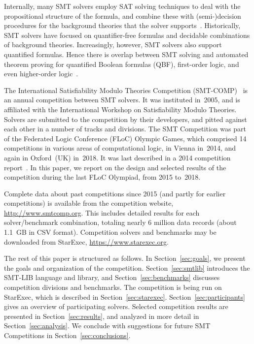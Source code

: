 \documentclass[dvipsnames,table,twoside,11pt]{article}
\begin{document}
Internally, many SMT solvers employ SAT solving techniques to deal
with the propositional structure of the formula, and combine these
with (semi-)decision procedures for the background theories that the
solver
supports~\cite{DBLP:conf/cav/BarrettCDHJKRT11,DBLP:conf/cade/BoutonODF09,DBLP:conf/tacas/MouraB08,Nieuwenhuis:2006:SSS:1217856.1217859}.
Historically, SMT solvers have focused on quantifier-free formulas and
decidable combinations of background theories.  Increasingly, however,
SMT solvers also support quantified formulas.  Hence there is overlap
between SMT solving and automated theorem proving for quantified
Boolean formulas (QBF), first-order logic, and even higher-order
logic~\cite{DBLP:journals/corr/abs-1712-01486}.

The International Satisfiability Modulo Theories Competition
(SMT-COMP)~\cite{BdMS05,BdMS07,BDdMOS13,BDOS08,BDOS10,CDW14,CGBD12} is
an annual competition between SMT solvers.  It was instituted in~2005,
and is affiliated with the International Workshop on Satisfiability
Modulo Theories.  Solvers are submitted to the competition by their
developers, and pitted against each other in a number of tracks and
divisions.  The SMT Competition was part of the Federated Logic
Conference (FLoC) Olympic Games, which comprised 14 competitions in
various areas of computational logic, in Vienna in~2014, and again in
Oxford~(UK) in~2018.  It was last described in a 2014 competition
report~\cite{CDW14}.  In this paper, we report on the design and
selected results of the competition during the last FLoC Olympiad,
from 2015 to~2018.

Complete data about past competitions since 2015 (and partly for
earlier competitions) is available from the competition website,
\url{http://www.smtcomp.org}.  This includes detailed results for each
solver/benchmark combination, totaling nearly 6 million data records
(about 1.1~GB in CSV format).  Competition solvers and benchmarks may
be downloaded from StarExec, \url{https://www.starexec.org}.

The rest of this paper is structured as follows.  In
Section~\ref{sec:goals}, we present the goals and organization of the
competition.  Section~\ref{sec:smtlib} introduces the SMT-LIB language
and library, and Section~\ref{sec:benchmarks} discusses competition
divisions and benchmarks.  The competition is being run on StarExec,
which is described in Section~\ref{sec:starexec}.
Section~\ref{sec:participants} gives an overview of participating
solvers.  Selected competition results are presented in
Section~\ref{sec:results}, and analyzed in more detail in
Section~\ref{sec:analysis}.  We conclude with suggestions for future
SMT Competitions in Section~\ref{sec:conclusions}.
\end{document}
